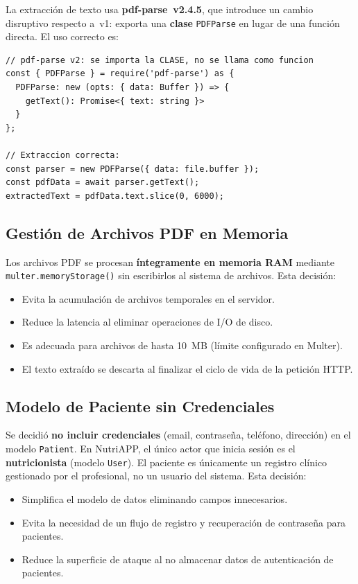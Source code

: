 \documentclass[12pt,a4paper]{article}
\begin{document}
La extracción de texto usa \textbf{pdf-parse~v2.4.5}, que introduce un cambio
disruptivo respecto a~v1: exporta una \textbf{clase} \texttt{PDFParse} en lugar de
una función directa. El uso correcto es:

\begin{lstlisting}[caption={Uso de la clase PDFParse (pdf-parse v2)},label={lst:pdfparse}]
// pdf-parse v2: se importa la CLASE, no se llama como funcion
const { PDFParse } = require('pdf-parse') as {
  PDFParse: new (opts: { data: Buffer }) => {
    getText(): Promise<{ text: string }>
  }
};

// Extraccion correcta:
const parser = new PDFParse({ data: file.buffer });
const pdfData = await parser.getText();
extractedText = pdfData.text.slice(0, 6000);
\end{lstlisting}

\subsection{Gestión de Archivos PDF en Memoria}

Los archivos PDF se procesan \textbf{íntegramente en memoria RAM} mediante
\texttt{multer.memoryStorage()} sin escribirlos al sistema de archivos. Esta decisión:

\begin{itemize}[leftmargin=1.5em]
  \item Evita la acumulación de archivos temporales en el servidor.
  \item Reduce la latencia al eliminar operaciones de I/O de disco.
  \item Es adecuada para archivos de hasta 10~MB (límite configurado en Multer).
  \item El texto extraído se descarta al finalizar el ciclo de vida de la petición HTTP.
\end{itemize}

\subsection{Modelo de Paciente sin Credenciales}

Se decidió \textbf{no incluir credenciales} (email, contraseña, teléfono, dirección)
en el modelo \texttt{Patient}. En NutriAPP, el único actor que inicia sesión es el
\textbf{nutricionista} (modelo \texttt{User}). El paciente es únicamente un registro
clínico gestionado por el profesional, no un usuario del sistema. Esta decisión:

\begin{itemize}[leftmargin=1.5em]
  \item Simplifica el modelo de datos eliminando campos innecesarios.
  \item Evita la necesidad de un flujo de registro y recuperación de contraseña para pacientes.
  \item Reduce la superficie de ataque al no almacenar datos de autenticación de pacientes.
\end{itemize}
\end{document}
